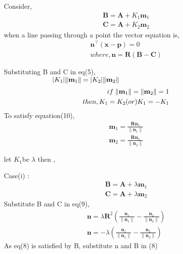 \raggedright Consider, \\
\begin{align}
\textbf{B} = \textbf{A}+{K}_{1}\textbf{m}_{1}\\
\textbf{C} = \textbf{A}+{K}_{2}\textbf{m}_{2}
\end{align}
when a line passing through a point the vector equation is,
\begin{align}
\textbf{n}^{\top}(\textbf{x}-\textbf{p})=0 \\
where ,  \textbf{n}=\textbf{R}(\textbf{B}-\textbf{C})
\end{align}
\raggedright Substituting B and C in eq(5), \\
$\hspace*{2.5cm}|{K}_{1}|\|\textbf{m}_{1}\|=|{K}_{2}|\|\textbf{m}_{2}\| $\\
\begin{align}
if \hspace*{0.1cm}\|\textbf{m}_{1}\| = \|\textbf{m}_{2}\| = 1 \\
then , {K}_{1}={K}_{2} (or){K}_{1}=-{K}_{1}\\
\end{align}
To satisfy equation(10),\\
\begin{align}
\textbf{m}_{1}=\frac{\textbf{R}\textbf{n}_{1}}{\|\textbf{n}_{1}\|} \\
\textbf{m}_{2}=\frac{\textbf{R}\textbf{n}_{2}}{\|\textbf{n}_{2}\|} 
\end{align}
\raggedright let $ {K}_{1} $\hspace*{0.1cm}be $ \lambda $ \hspace*{0.1cm} then , \\
\raggedright Case(i) : \\
\begin{align}
\textbf{B} = \textbf{A}+\lambda\textbf{m}_{1}\\
\textbf{C} = \textbf{A}+\lambda\textbf{m}_{2}
\end{align}
Substitute B and C in eq(9),\\
\begin{align}
\textbf{n}=\lambda\textbf{R}^{2}(\frac{\textbf{n}_{1}}{\| \textbf{n}_{1} \|}-\frac{\textbf{n}_{2}}{\| \textbf{n}_{2} \|}) \\
\textbf{n}=-\lambda(\frac{\textbf{n}_{1}}{\| \textbf{n}_{1} \|}-\frac{\textbf{n}_{2}}{\| \textbf{n}_{2} \|})
\end{align}
As eq(8) is satisfied by B, substitute n and B in (8) \\
